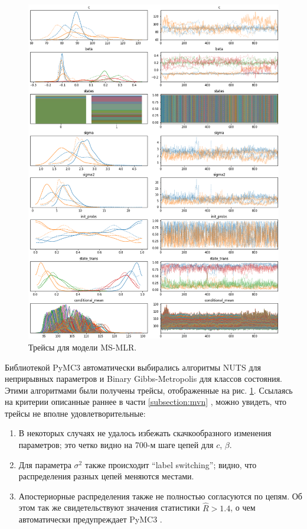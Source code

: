 \documentclass[a4paper,14pt]{extreport}
\begin{document}
\begin{figure}[H]
	\includegraphics[width=\linewidth]{img/gen/pp_ms_arx_trace.png}
	\caption{Трейсы для модели MS-MLR. }
	\label{fig:pp_ms_arx_trace}
\end{figure}

Библиотекой PyMC3 автоматически выбирались алгоритмы NUTS \cite{nuts_hoffman_gelman} для неприрывных параметров и Binary Gibbs-Metropolis \cite{pymc3_2016} для классов состояния. Этими алгоритмами были получены трейсы, отображенные на рис. \ref{fig:pp_ms_arx_trace}. Ссылаясь на критерии описанные раннее в части \ref{subsection:mvn} \cite{stan_user_guide}, можно увидеть, что трейсы не вполне удовлетворительные:

\begin{enumerate}
	\item В некоторых случаях не удалось избежать скачкообразного изменения параметров; это четко видно на 700-м шаге цепей для $c$, $\beta$.
	\item Для параметра $\sigma^2$ также происходит ``label switching''; видно, что распределения разных цепей меняются местами.
	\item Апостериорные распределения также не полностью согласуются по цепям. Об этом так же свидетельствуют значения статистики $\hat{R} > 1.4$, о чем автоматически предупреждает PyMC3 \cite{pymc3_2016,nuts_hoffman_gelman}.
\end{enumerate}
\end{document}
